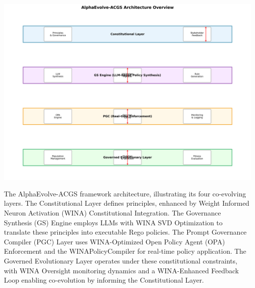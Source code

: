 \documentclass[manuscript,screen,review,anonymous,9pt]{acmart}
\begin{document}

\maketitle

\begin{teaserfigure}
\centering
\includegraphics[width=\textwidth,height=0.35\textheight,keepaspectratio]{figs/architecture_overview.png}
\caption{The AlphaEvolve-ACGS framework architecture, illustrating its four co-evolving layers. The Constitutional Layer defines principles, enhanced by Weight Informed Neuron Activation (WINA) Constitutional Integration. The Governance Synthesis (GS) Engine employs LLMs with WINA SVD Optimization to translate these principles into executable Rego policies. The Prompt Governance Compiler (PGC) Layer uses WINA-Optimized Open Policy Agent (OPA) Enforcement and the WINAPolicyCompiler for real-time policy application. The Governed Evolutionary Layer operates under these constitutional constraints, with WINA Oversight monitoring dynamics and a WINA-Enhanced Feedback Loop enabling co-evolution by informing the Constitutional Layer.}
\label{fig:architecture}

\end{teaserfigure}
\end{document}
